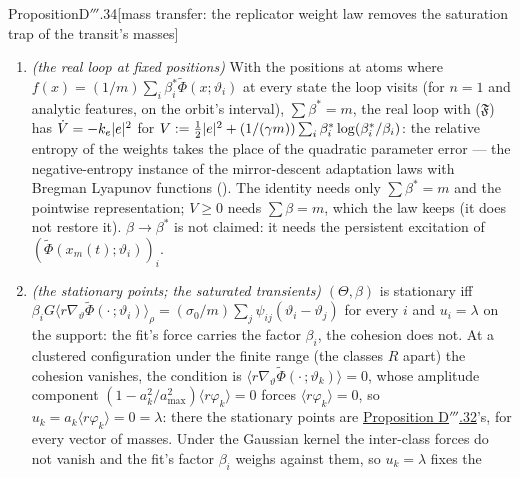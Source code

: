 \begin{thm}{Proposition}{D$'''$.34}[mass transfer: the replicator weight law removes the saturation trap of the
transit's masses]
\begin{enumerate}[label=\textup{(\roman*)}]
    $\abs{\fhat}\le(1/m)\sum\beta_i\abs{a_i}\le a_{\max}$ as for equal weights: no projection is needed. With
    $\beta\equiv1$ and $\gamma = 0$ it is the loop of \hyperref[res:thmDppp:32]{Proposition D$'''$.32}. (A
    Wasserstein--Fisher--Rao metric would weigh the positions by their masses,
    $\sum_i\beta_i\norm{\delta\vartheta_i}^2_{G^{-1}}$: its drift lacks the factor $\beta_i$ on the fit and divides
    the cohesion force by $\beta_i$; and $J$ is not a function of $\mu_{\Theta,\beta}$ alone, its cohesion being the
    unweighted cloud's.)
  \item \begin{sloppypar}\emph{(the real loop at fixed positions)} With the positions at atoms where
    $f(x) = (1/m)\sum_i\beta^*_i\tilde\Phi(x;\vartheta_i)$ at every state the loop visits (for $n = 1$ and analytic
    features, on the orbit's interval), $\sum\beta^* = m$, the real loop with \textup{($\mathfrak{F}$)} has
    $\dot V = -k_e\lvert e\rvert^2$ for
    $V := \frac12\lvert e\rvert^2 + (1/(\gamma m))\sum_i\beta^*_i\log(\beta^*_i/\beta_i)$: the relative entropy of the
    weights takes the place of the quadratic parameter error --- the negative-entropy instance of the mirror-descent
    adaptation laws with Bregman Lyapunov functions (\cite{S62}). The identity needs only $\sum\beta^* = m$ and the
    pointwise representation; $V\ge0$ needs $\sum\beta = m$, which the law keeps (it does not restore it).
    $\beta\to\beta^*$ is not claimed: it needs the persistent excitation of $(\tilde\Phi(x_m(t);\vartheta_i))_i$.\end{sloppypar}
  \item \emph{(the stationary points; the saturated transients)} $(\Theta,\beta)$ is stationary iff
    $\beta_iG\langle r\nabla_\vartheta\tilde\Phi(\cdot\,;\vartheta_i)\rangle_\rho
    = (\sigma_0/m)\sum_j\psi_{ij}(\vartheta_i - \vartheta_j)$ for every $i$ and $u_i = \lambda$ on the support: the
    fit's force carries the factor $\beta_i$, the cohesion does not. At a clustered configuration under the finite
    range (the classes $R$ apart) the cohesion vanishes, the condition is
    $\langle r\nabla_\vartheta\tilde\Phi(\cdot\,;\vartheta_k)\rangle = 0$, whose amplitude component
    $(1 - a_k^2/a_{\max}^2)\langle r\varphi_k\rangle = 0$ forces $\langle r\varphi_k\rangle = 0$, so
    $u_k = a_k\langle r\varphi_k\rangle = 0 = \lambda$: there the stationary points are
    \hyperref[res:thmDppp:32]{Proposition D$'''$.32}'s, for every vector of masses. Under the Gaussian kernel the
    inter-class forces do not vanish and the fit's factor $\beta_i$ weighs against them, so $u_k = \lambda$ fixes the

\end{enumerate}
\end{thm}

